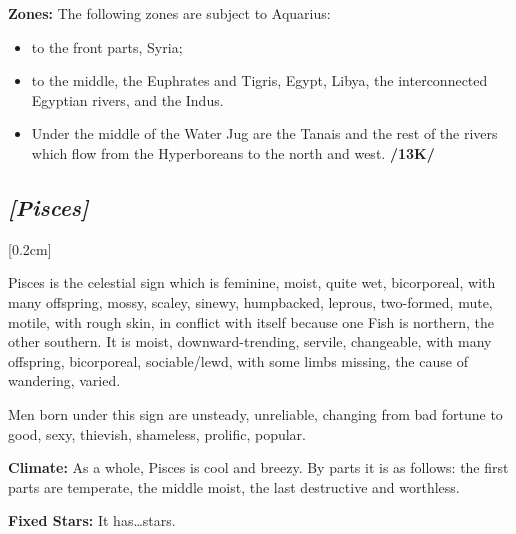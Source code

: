 \textbf{Zones:} The following zones are subject to Aquarius:
\begin{itemize}
\item to the front parts, Syria; 
\item to the middle, the Euphrates and Tigris, Egypt, Libya, the interconnected Egyptian rivers, and the Indus. 
\item Under the middle of the Water Jug are the Tanais and the rest of the rivers which flow from the Hyperboreans to the north and west. \textbf{/13K/}
\end{itemize}

\secbr
\subsection{\textit{[Pisces]}}
[0.2cm]

 Pisces is the celestial sign which is  feminine,  moist, quite wet,  bicorporeal, with many offspring, mossy, scaley, sinewy, humpbacked, leprous,  two-formed,  mute, motile, with rough skin, in conflict with itself because one Fish is northern, the other southern. It is moist, downward-trending,  servile, changeable, with many offspring, bicorporeal, sociable/lewd, with some limbs missing, the cause of wandering, varied.

Men born under this sign are unsteady, unreliable, changing from bad fortune to good, sexy, thievish, shameless, prolific, popular.

\textbf{Climate:} As a whole, Pisces is cool and breezy. By parts it is as follows: the first parts are temperate, the
middle moist, the last destructive and worthless. 

\textbf{Fixed Stars:} It has…stars. 


